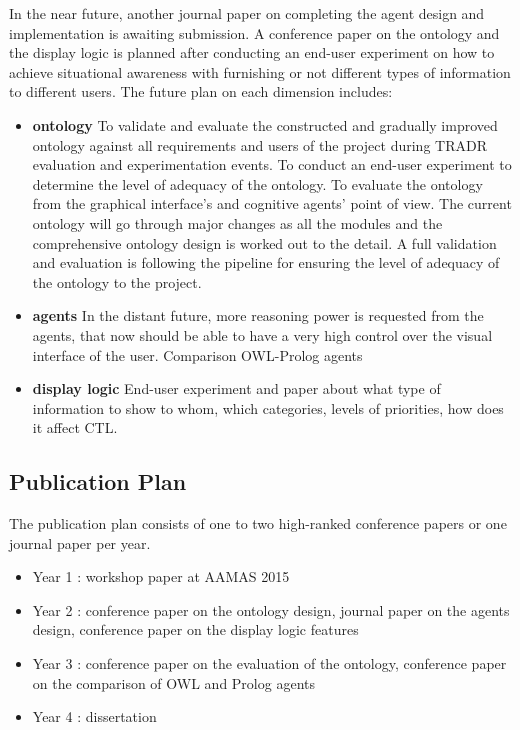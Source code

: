 In the near future, another journal paper on completing the agent design and implementation is awaiting submission. A conference paper on the ontology and the display logic is planned after conducting an end-user experiment on how to achieve situational awareness with furnishing or not different types of information to different users.
The future plan on each dimension includes:
\begin{itemize}
\item \textbf{ontology}  To validate and evaluate the constructed and gradually improved ontology against all requirements and users of the project during TRADR evaluation and experimentation events. To conduct an end-user experiment to determine the level of adequacy of the ontology. To evaluate the ontology from the graphical interface's and cognitive agents' point of view.  
The current ontology will go through major changes as all the modules and the comprehensive ontology design is worked out to the detail. A full validation and evaluation is following the pipeline for ensuring the level of adequacy of the ontology to the project.
\item \textbf{agents} In the distant future, more reasoning power is requested from the agents, that now should be able to have a very high control over the visual interface of the user. 
Comparison OWL-Prolog agents
\item \textbf{display logic} End-user experiment and paper about what type of information to show to whom, which categories, levels of priorities, how does it affect CTL.
\end{itemize}

\subsection{Publication Plan}

The publication plan consists of one to two high-ranked conference papers or one journal paper per year. 
\begin{itemize}
\item Year 1 : workshop paper at AAMAS 2015
\item Year 2 : conference paper on the ontology design, journal paper on the agents design, conference paper on the display logic features
\item Year 3 : conference paper on the evaluation of the ontology, conference paper on the comparison of OWL and Prolog agents
\item Year 4 : dissertation 
\end{itemize}

